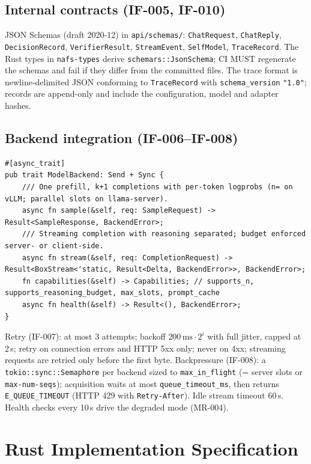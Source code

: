\documentclass[11pt,a4paper]{article}
\begin{document}
\subsection{Internal contracts (IF-005, IF-010)}
\begin{sloppypar}
JSON Schemas (draft 2020-12) in \texttt{api/schemas/}: \texttt{ChatRequest}, \texttt{ChatReply}, \texttt{DecisionRecord}, \texttt{VerifierResult}, \texttt{StreamEvent}, \texttt{SelfModel}, \texttt{TraceRecord}. The Rust types in \texttt{nafs-types} derive \texttt{schemars::JsonSchema}; CI MUST regenerate the schemas and fail if they differ from the committed files. The trace format is newline-delimited JSON conforming to \texttt{TraceRecord} with \texttt{schema\_version} \texttt{"1.0"}; records are append-only and include the configuration, model and adapter hashes.
\end{sloppypar}
\subsection{Backend integration (IF-006--IF-008)}
\begin{lstlisting}[caption={Backend trait (\texttt{nafs-core})}]
#[async_trait]
pub trait ModelBackend: Send + Sync {
    /// One prefill, k+1 completions with per-token logprobs (n= on vLLM; parallel slots on llama-server).
    async fn sample(&self, req: SampleRequest) -> Result<SampleResponse, BackendError>;
    /// Streaming completion with reasoning separated; budget enforced server- or client-side.
    async fn stream(&self, req: CompletionRequest) -> Result<BoxStream<'static, Result<Delta, BackendError>>, BackendError>;
    fn capabilities(&self) -> Capabilities; // supports_n, supports_reasoning_budget, max_slots, prompt_cache
    async fn health(&self) -> Result<(), BackendError>;
}
\end{lstlisting}
Retry (IF-007): at most 3 attempts; backoff $200\,\text{ms}\cdot2^{i}$ with full jitter, capped at 2\,s; retry on connection errors and HTTP 5xx only; never on 4xx; streaming requests are retried only before the first byte. Backpressure (IF-008): a \texttt{tokio::sync::Semaphore} per backend sized to \texttt{max\_in\_flight} (= server slots or \texttt{max-num-seqs}); acquisition waits at most \texttt{queue\_timeout\_ms}, then returns \texttt{E\_QUEUE\_TIMEOUT} (HTTP 429 with \texttt{Retry-After}). Idle stream timeout 60\,s. Health checks every 10\,s drive the degraded mode (MR-004).

\section{Rust Implementation Specification}
\label{sec:rust}
\end{document}

